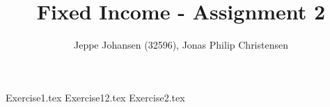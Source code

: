 \documentclass[12pt,a4paper]{article}
\author{Jeppe Johansen (32596), Jonas Philip Christensen}
\title{Fixed Income - Assignment 2}
\begin{document}
\maketitle

{Exercise1.tex}
{Exercise12.tex}
{Exercise2.tex}
\end{document}
